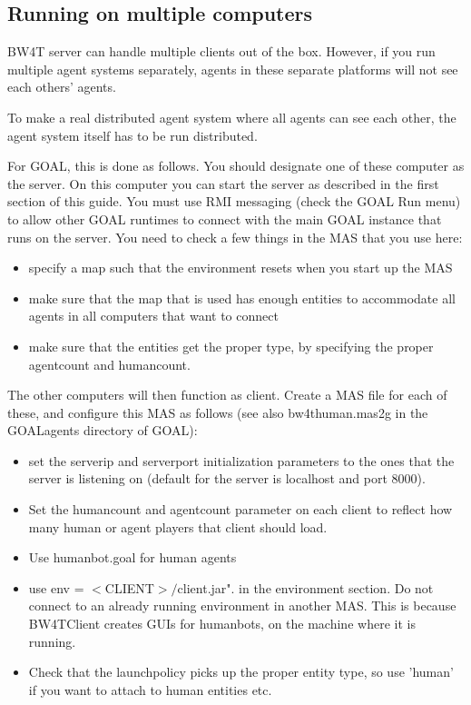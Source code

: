 \documentclass[11pt,a4paper]{article}
\begin{document}
\subsection{Running on multiple computers}
BW4T server can handle multiple clients out of the box. However, if you run multiple agent systems separately, agents in these separate platforms will not see each others' agents. 

To make a real distributed agent system where all agents can see each other, the agent system itself has to be run distributed. 

For GOAL, this is done as follows. You should designate one of these computer as the server. On this computer you can start the server as described in the first section of this guide. You must use RMI messaging (check the GOAL Run menu) to allow other GOAL runtimes to connect with the main GOAL instance that runs on the server.
You need to check a few things in the MAS that you use here:
\begin{itemize}
\item specify a map such that the environment resets when you start up the MAS
\item make sure that the map that is used has enough entities to accommodate all agents in all computers that want to connect
\item make sure that the entities get the proper type, by specifying the proper agentcount and humancount.
\end{itemize}
The other computers will then function as client. Create a MAS file for each of these, and configure this MAS as follows (see also bw4thuman.mas2g in the GOALagents directory of GOAL):
\begin{itemize}
\item set the serverip and serverport initialization parameters to the ones that the server is listening on (default for the server is localhost and port 8000).
\item Set the humancount and agentcount parameter on each client to reflect how many human or agent players that client should load.
\item Use humanbot.goal for human agents
\item use env = $<$CLIENT$>/$client.jar". in the environment section. Do not connect to an already running environment in another MAS. This is because BW4TClient creates GUIs for humanbots, on the machine where it is running.
\item Check that the launchpolicy picks up the proper entity type, so use 'human' if you want to attach to human entities etc.
\end{itemize} 
\end{document}
